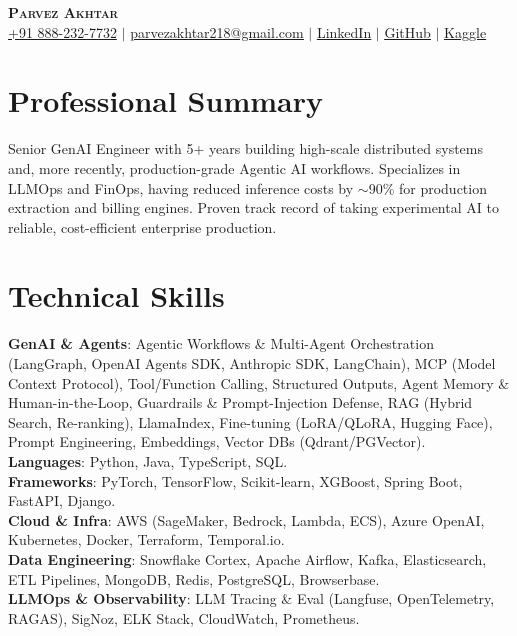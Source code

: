 \documentclass[11pt,a4paper]{article}
\begin{document}
\begin{center}
    \textbf{\Huge \scshape Parvez Akhtar} \\ \vspace{1pt}
    \small \href{tel:+918882327732}{+91 888-232-7732} $|$ \href{mailto:parvezakhtar218@gmail.com}{\underline{parvezakhtar218@gmail.com}} $|$
    \href{https://www.linkedin.com/in/parvezakhtar/}{\underline{LinkedIn}} $|$
    \href{https://github.com/ipmob}{\underline{GitHub}} $|$
    \href{https://www.kaggle.com/parvez218}{\underline{Kaggle}}
\end{center}

\section{Professional Summary}
\small{Senior GenAI Engineer with 5+ years building high-scale distributed systems and, more recently, production-grade Agentic AI workflows. Specializes in LLMOps and FinOps, having reduced inference costs by $\sim$90\% for production extraction and billing engines. Proven track record of taking experimental AI to reliable, cost-efficient enterprise production.}

\section{Technical Skills}
 \begin{itemize}[leftmargin=0.15in, label={}]
    \small{\item{
     \textbf{GenAI \& Agents}{: Agentic Workflows \& Multi-Agent Orchestration (LangGraph, OpenAI Agents SDK, Anthropic SDK, LangChain), MCP (Model Context Protocol), Tool/Function Calling, Structured Outputs, Agent Memory \& Human-in-the-Loop, Guardrails \& Prompt-Injection Defense, RAG (Hybrid Search, Re-ranking), LlamaIndex, Fine-tuning (LoRA/QLoRA, Hugging Face), Prompt Engineering, Embeddings, Vector DBs (Qdrant/PGVector).} \\
     \textbf{Languages}{: Python, Java, TypeScript, SQL.} \\
     \textbf{Frameworks}{: PyTorch, TensorFlow, Scikit-learn, XGBoost, Spring Boot, FastAPI, Django.} \\
     \textbf{Cloud \& Infra}{: AWS (SageMaker, Bedrock, Lambda, ECS), Azure OpenAI, Kubernetes, Docker, Terraform, Temporal.io.} \\
     \textbf{Data Engineering}{: Snowflake Cortex, Apache Airflow, Kafka, Elasticsearch, ETL Pipelines, MongoDB, Redis, PostgreSQL, Browserbase.} \\
     \textbf{LLMOps \& Observability}{: LLM Tracing \& Eval (Langfuse, OpenTelemetry, RAGAS), SigNoz, ELK Stack, CloudWatch, Prometheus.}
    }}
 \end{itemize}
\end{document}

